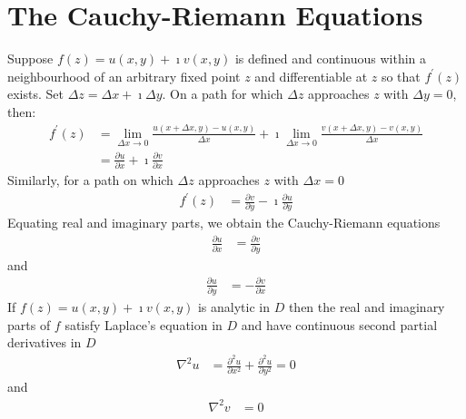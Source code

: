 \documentclass[a4paper,twoside,10pt,english]{report}
\begin{document}
\section{The Cauchy-Riemann Equations}
Suppose $f\left(z\right)=u(x,y)+\imath v(x,y)$ is defined and continuous within
a neighbourhood of an arbitrary fixed point $z$ and differentiable
at $z$ so that $f^{\prime}\left(z\right)$ exists. Set $\Delta z=\Delta x+\imath\Delta y$.
On a path for which $\Delta z$ approaches $z$ with $\Delta y=0$,
then:
\begin{align*}
f^{\prime}\left(z\right) & = \lim_{\Delta x\rightarrow0}\frac{u(x+\Delta x,y)-u(x,y)}{\Delta x}+\imath\lim_{\Delta x\rightarrow0}\frac{v(x+\Delta x,y)-v(x,y)}{\Delta x}\\
 & = \frac{\partial u}{\partial x}+\imath\frac{\partial v}{\partial x}
\end{align*}
Similarly, for a path on which $\Delta z$ approaches $z$ with $\Delta x=0$
\begin{align*}
f^{\prime}\left(z\right) & = \frac{\partial v}{\partial y}-\imath\frac{\partial u}{\partial y}
\end{align*}
Equating real and imaginary parts, we obtain the Cauchy-Riemann equations
\begin{align*}
\frac{\partial u}{\partial x} & = \frac{\partial v}{\partial y}
\end{align*}
and
\begin{align*}
\frac{\partial u}{\partial y} & = -\frac{\partial v}{\partial x}
\end{align*}
If $f\left(z\right)=u(x,y)+\imath v(x,y)$ is analytic in $D$ then the real
and imaginary parts of $f$ satisfy Laplace's equation in $D$ and
have continuous second partial derivatives in $D$
\begin{align*}
\nabla^{2}u & = \frac{\partial^{2}u}{\partial x^{2}}+\frac{\partial^{2}u}{\partial y^{2}}=0
\end{align*}
and
\begin{align*}
\nabla^{2}v & = 0
\end{align*}
\end{document}
